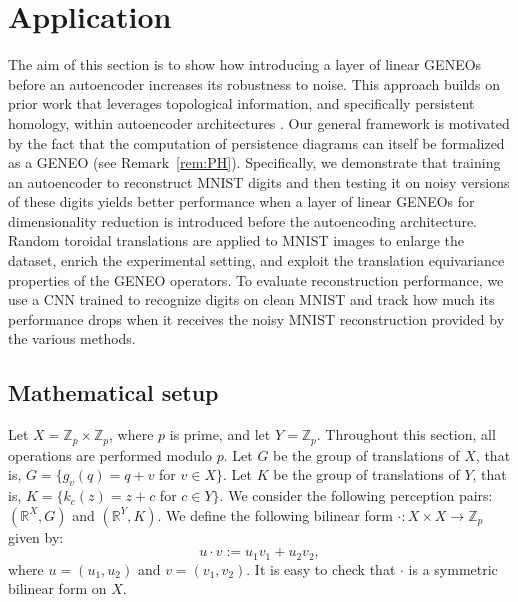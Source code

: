 \documentclass[11pt]{article}
\newcommand{\R}{\mathbb{R}}
\newcommand{\pat}[1]{\todo[author=Patrizio]{#1}}
\newtheorem{proposition}[theorem]{Proposition}
\begin{document}
\section{Application}
\label{Application}
The aim of this section is to show how introducing a layer of linear GENEOs before an autoencoder increases its robustness to noise. This approach builds on prior work that leverages topological information, and specifically persistent homology, within autoencoder architectures \cite{pmlr-v119-moor20a}. Our general framework is motivated by the fact that the computation of persistence diagrams can itself be formalized as a GENEO (see Remark~\ref{rem:PH}). Specifically, we demonstrate that training an autoencoder to reconstruct MNIST digits and then testing it on noisy versions of these digits yields better performance when a layer of linear GENEOs for dimensionality reduction is introduced before the autoencoding architecture. Random toroidal translations are applied to MNIST images to enlarge the dataset, enrich the experimental setting, and exploit the translation equivariance properties of the GENEO operators. To evaluate reconstruction performance, we use a CNN trained to recognize digits on clean MNIST and track how much its performance drops when it receives the noisy MNIST reconstruction provided by the various methods.

\subsection{Mathematical setup}
Let $X = \mathbb{Z}_p \times \mathbb{Z}_p$, where $p$ is prime, and let $Y = \mathbb{Z}_p$. Throughout this section, all operations are performed modulo $p$. Let $G$ be the group of translations of $X$, that is, $G = \{g_v(q) = q + v$ for $v \in X\}$. Let $K$ be the group of translations of $Y$, that is, $K = \{k_c(z) = z + c$ for $c \in Y\}$. We consider the following perception pairs: $(\R^X, G)$ and $(\R^Y, K)$. We define the following bilinear form $\cdot : X \times X \to \mathbb{Z}_p$ given by:
\[
u \cdot v := u_1v_1 + u_2v_2,
\]
where $u = (u_1, u_2)$ and $v = (v_1, v_2)$. It is easy to check that $\cdot$ is a symmetric bilinear form on $X$.


    
\end{document}
